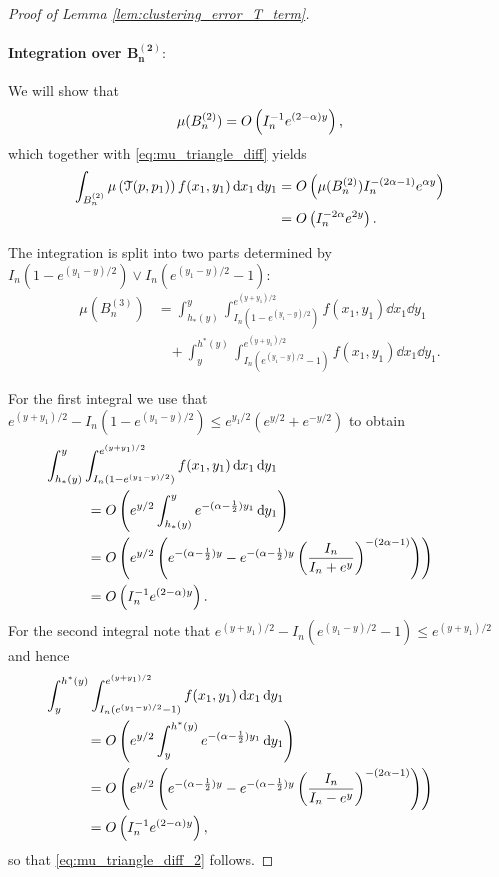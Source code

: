 \begin{proof}[Proof of Lemma \ref{lem:clustering_error_T_term}]
\paragraph{Integration over $\bm{B_n^{(2)}}:$}

We will show that
\begin{equation}\label{eq:mu_triangle_diff_2}
	\mu(B_n^{(2)}) = O\left(I_n^{-1} e^{(2-\alpha)y}\right),
\end{equation}
which together with \eqref{eq:mu_triangle_diff} yields
\begin{align*}
	\int_{B_n^{(2)}} \mu\left(\mathcal{T}(p,p_1)\right) 
		f(x_1,y_1)	\operatorname{\mathrm{d}\hspace{-2pt}} x_1 \operatorname{\mathrm{d}\hspace{-2pt}} y_1
	&= O\left(\mu(B_n^{(2)}) I_n^{-(2\alpha - 1)} e^{\alpha y}\right)\\
	&= O\left(I_n^{-2\alpha} e^{2y}\right).
\end{align*}

The integration is split into two parts determined by $I_n\left(1 - e^{(y_1-y)/2}\right) \vee 
	I_n\left(e^{(y_1 - y)/2} - 1\right)$:
\begin{align*}
	\mu(B_n^{(3)}) &= \int_{h_\ast(y)}^{y} \int_{I_n(1-e^{(y_1-y)/2})}^{e^{(y + y_1)/2}} 
		f(x_1,y_1) \dd x_1 \dd y_1\\
	&\hspace{10pt} + \int_y^{h^\ast(y)} \int_{I_n(e^{(y_1-y)/2}-1)}^{e^{(y + y_1)/2}} 
		f(x_1,y_1) \dd x_1 \dd y_1.
\end{align*}

For the first integral we use that $e^{(y + y_1)/2} - I_n(1-e^{(y_1-y)/2}) \le e^{y_1/2}\left(e^{y/2} + e^{-y/2}\right)$ to obtain
\begin{align*}
	&\hspace{-30pt}\int_{h_\ast(y)}^{y} \int_{I_n(1-e^{(y_1-y)/2})}^{e^{(y + y_1)/2}} f(x_1,y_1) 
		\dd x_1 \dd y_1\\
	&= \bigO{e^{y/2} \int_{h_\ast(y)}^{y} e^{-(\alpha - \frac{1}{2})y_1} \dd y_1}\\
	&= \bigO{e^{y/2}\left(e^{-(\alpha - \frac{1}{2})y} - e^{-(\alpha - \frac{1}{2})y} 
		\left(\frac{I_n}{I_n + e^y}\right)^{-(2\alpha - 1)}\right)}\\
	&= \bigO{I_n^{-1} e^{(2-\alpha)y}}.
\end{align*}
For the second integral note that $e^{(y + y_1)/2} - I_n(e^{(y_1-y)/2}-1) \le e^{(y + y_1)/2}$ and hence
\begin{align*}
	&\hspace{-30pt}\int_y^{h^\ast(y)} \int_{I_n(e^{(y_1-y)/2}-1)}^{e^{(y + y_1)/2}} f(x_1,y_1) 
		\dd x_1 \dd y_1\\
	&= \bigO{e^{y/2} \int_y^{h^\ast(y)} e^{-(\alpha - \frac{1}{2})y_1} \dd y_1}\\
	&= \bigO{e^{y/2} \left(e^{-(\alpha - \frac{1}{2})y} - e^{-(\alpha - \frac{1}{2})y}
		\left(\frac{I_n}{I_n - e^y}\right)^{-(2\alpha - 1)}\right)}\\
	&= \bigO{I_n^{-1} e^{(2-\alpha)y}},
\end{align*}
so that \eqref{eq:mu_triangle_diff_2} follows.


\end{proof}
